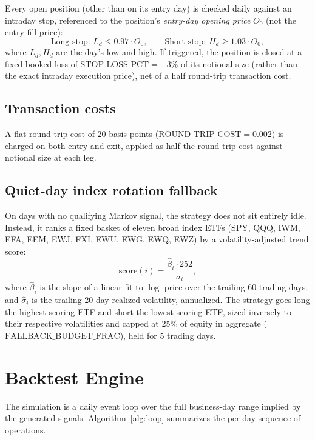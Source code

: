 \documentclass[11pt]{article}
\begin{document}
Every open position (other than on its entry day) is checked daily against
an intraday stop, referenced to the position's \emph{entry-day opening
price} $O_0$ (not the entry fill price):
\[
  \text{Long stop: } L_d \le 0.97 \cdot O_0,
  \qquad
  \text{Short stop: } H_d \ge 1.03 \cdot O_0,
\]
where $L_d, H_d$ are the day's low and high. If triggered, the position is
closed at a fixed booked loss of $\text{STOP\_LOSS\_PCT} = -3\%$ of its
notional size (rather than the exact intraday execution price), net of a
half round-trip transaction cost.

\subsection{Transaction costs}

A flat round-trip cost of 20 basis points ($\text{ROUND\_TRIP\_COST} =
0.002$) is charged on both entry and exit, applied as half the round-trip
cost against notional size at each leg.

\subsection{Quiet-day index rotation fallback}

On days with no qualifying Markov signal, the strategy does not sit
entirely idle. Instead, it ranks a fixed basket of eleven broad index ETFs
(SPY, QQQ, IWM, EFA, EEM, EWJ, FXI, EWU, EWG, EWQ, EWZ) by a
volatility-adjusted trend score:
\[
  \text{score}(i) = \frac{\hat\beta_i \cdot 252}{\hat\sigma_i},
\]
where $\hat\beta_i$ is the slope of a linear fit to $\log$-price over the
trailing 60 trading days, and $\hat\sigma_i$ is the trailing 20-day
realized volatility, annualized. The strategy goes long the
highest-scoring ETF and short the lowest-scoring ETF, sized inversely to
their respective volatilities and capped at 25\% of equity in aggregate
($\text{FALLBACK\_BUDGET\_FRAC}$), held for 5 trading days.

\section{Backtest Engine}

The simulation is a daily event loop over the full business-day range
implied by the generated signals. Algorithm~\ref{alg:loop} summarizes the
per-day sequence of operations.
\end{document}
